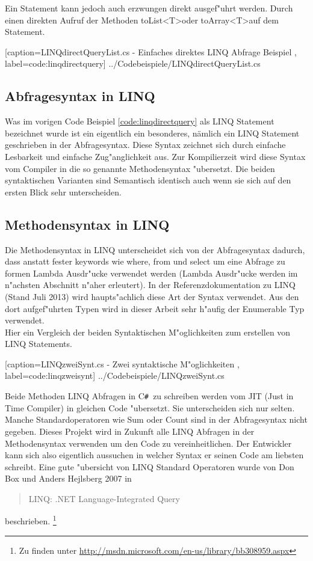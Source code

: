 \documentclass[pagesize, paper=a4, fontsize=12pt,titlepage=true, headings=small, headnosepline, abstractoff, liststotoc, nochapterprefix, plainheadsepline]{scrreprt}
\newcommand{\CSS}{C\texttt{\# }}
\newcommand{\GTS}{\textless T\textgreater\space}
\begin{document}
Ein Statement kann jedoch auch erzwungen direkt ausgef"uhrt werden. Durch einen direkten Aufruf der Methoden toList\GTS oder toArray\GTS auf dem Statement.

			[caption={LINQdirectQueryList.cs - Einfaches direktes LINQ Abfrage Beispiel} \protect\cite{MicrosoftCReferenz.2013}, label=code:linqdirectquery]
			{../Codebeispiele/LINQdirectQueryList.cs}
		\subsection {Abfragesyntax in LINQ}
		Was im vorigen Code Beispiel \ref{code:linqdirectquery} als LINQ Statement bezeichnet wurde ist ein eigentlich ein besonderes, nämlich ein LINQ Statement geschrieben in der Abfragesyntax. Diese Syntax zeichnet sich durch einfache Lesbarkeit und einfache Zug"anglichkeit aus. Zur Kompilierzeit wird diese Syntax vom Compiler in die so genannte Methodensyntax "ubersetzt. Die beiden syntaktischen Varianten sind Semantisch identisch auch wenn sie sich auf den ersten Blick sehr unterscheiden.
		\subsection {Methodensyntax in LINQ}
		Die Methodensyntax in LINQ unterscheidet sich von der Abfragesyntax dadurch, dass anstatt fester keywords wie where, from und select um eine Abfrage zu formen Lambda Ausdr"ucke verwendet werden (Lambda Ausdr"ucke werden im n"achsten Abschnitt n"aher erleutert). In der Referenzdokumentation zu LINQ (Stand Juli 2013) \cite{MicrosoftCReferenz.2013} wird haupts"achlich diese Art der Syntax verwendet. Aus den dort aufgef"uhrten Typen wird in dieser Arbeit sehr h"aufig der Enumerable Typ verwendet.
\\
Hier ein Vergleich der beiden Syntaktischen M"oglichkeiten zum erstellen von LINQ Statements.

			[caption={LINQzweiSynt.cs - Zwei syntaktische M"oglichkeiten} \protect\cite{MicrosoftCReferenz.2013}, label=code:linqzweisynt]
			{../Codebeispiele/LINQzweiSynt.cs}

Beide Methoden LINQ Abfragen in \CSS zu schreiben werden vom JIT (Just in Time Compiler) in gleichen Code "ubersetzt. Sie unterscheiden sich nur selten. Manche Standardoperatoren wie Sum oder Count sind in der Abfragesyntax nicht gegeben. Dieses Projekt wird in Zukunft alle LINQ Abfragen in der Methodensyntax verwenden um den Code zu vereinheitlichen. Der Entwickler kann sich also eigentlich aussuchen in welcher Syntax er seinen Code am liebsten schreibt. Eine gute "ubersicht von LINQ Standard Operatoren wurde von Don Box und Anders Hejlsberg 2007 in \begin{quote}LINQ: .NET Language-Integrated Query \cite[Standard Query Operators in a Nutshell]{Box.2007}\end{quote} beschrieben. \footnote{Zu finden unter \url{http://msdn.microsoft.com/en-us/library/bb308959.aspx}}
\newline
\end{document}
